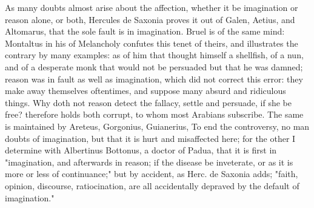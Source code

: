As many doubts almost arise about the affection, whether
it be imagination or reason alone, or both, Hercules de Saxonia proves it out
of Galen, Aetius, and Altomarus, that the sole fault is in
imagination. Bruel is of the same mind: Montaltus in his
 of Melancholy confutes this tenet of theirs, and
illustrates the contrary by many examples: as of him that thought himself a
shellfish, of a nun, and of a desperate monk that would not be persuaded but
that he was damned; reason was in fault as well as imagination, which did not
correct this error: they make away themselves oftentimes, and suppose many
absurd and ridiculous things. Why doth not reason detect the fallacy, settle
and persuade, if she be free? \Avicenna{} therefore holds
both corrupt, to whom most Arabians subscribe. The same is maintained by
Areteus, Gorgonius, Guianerius,
\etc{} To end the controversy, no man doubts of imagination, but that it is
hurt and misaffected here; for the other I determine with
Albertinus Bottonus, a doctor of Padua, that it is first
in "imagination, and afterwards in reason; if the disease be inveterate, or as
it is more or less of continuance;" but by accident, as
Herc. de Saxonia adds; "faith, opinion, discourse,
ratiocination, are all accidentally depraved by the default of imagination."

